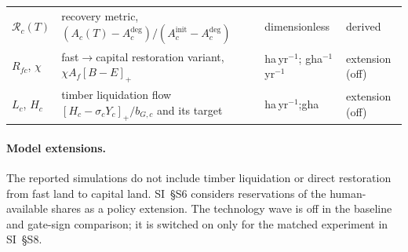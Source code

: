 \documentclass[11pt,a4paper]{article}
\newcommand{\pos}[1]{\left[#1\right]_+}
\begin{document}
\begin{longtable}{>{\raggedright\arraybackslash}p{}>{\raggedright\arraybackslash}p{}>{\raggedright\arraybackslash}p{}>{\raggedright\arraybackslash}p{}}
$\mathcal R_c(T)$ & recovery metric, $(A_c(T)-A_c^{\mathrm{deg}})/(A_c^{\mathrm{init}}-A_c^{\mathrm{deg}})$ & dimensionless & derived \\
$R_{fc}$, $\chi$ & fast$\to$capital restoration variant, $\chi A_f\pos{B-E}$ & ha\,yr$^{-1}$; gha$^{-1}$\,yr$^{-1}$ & extension (off) \\
$L_c$, $H_c$ & timber liquidation flow $\pos{H_c-\sigma_cY_c}/b_{G,c}$ and its target & ha\,yr$^{-1}$;\newline gha & extension (off) \\
\bottomrule
\end{longtable}

\paragraph{Model extensions.} The reported simulations do not include timber liquidation or direct restoration from fast land to capital land. SI~\S S6 considers reservations of the human-available shares as a policy extension. The technology wave is off in the baseline and gate-sign comparison; it is switched on only for the matched experiment in SI~\S S8.
\end{document}
